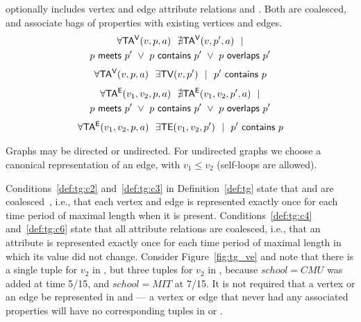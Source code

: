 \begin{definition}
\tve optionally includes vertex and edge attribute relations \tav
and \tae.  Both are coalesced, and associate bags of properties with
existing vertices and edges.
\begin{multline}
\forall \mathsf{TA^{V}}(v, p, a)~~\nexists \mathsf{TA^{V}}(v, p', a)~~| \\
                       p~\mathsf{meets}~p'~\lor~p~\mathsf{contains}~p'~\lor~p~\mathsf{overlaps}~p'
\label{def:tg:c4}
\end{multline}
\vspace{-0.5cm}
\begin{multline}
\forall \mathsf{TA^{V}}(v, p, a)~~\exists \textsf{TV}(v,p')~~|~~p'~\mathsf{contains}~p
\label{def:tg:c5}
\end{multline}
\vspace{-0.5cm}
\begin{multline}
\forall \mathsf{TA^{E}}(v_1, v_2, p, a)~~\nexists \mathsf{TA^{E}}(v_1, v_2, p', a)~~| \\
                       p~\mathsf{meets}~p'~\lor~p~\mathsf{contains}~p'~\lor~p~\mathsf{overlaps}~p'
\label{def:tg:c6}
\end{multline}
\vspace{-0.5cm}
\begin{multline}
\forall \mathsf{TA^{E}}(v_1, v_2, p, a)~~\exists \textsf{TE}(v_1,v_2,p')~~|~~p'~\mathsf{contains}~p
\label{def:tg:c7}
\end{multline}
\vspace{-0.6cm}
\label{def:tg}
\end{definition}

Graphs may be directed or undirected.  For undirected graphs we choose
a canonical representation of an edge, with $v_1 \leq v_2$ (self-loops
are allowed).

Conditions~\ref{def:tg:c2} and~\ref{def:tg:c3} in
Definition~\ref{def:tg} state that \tv and \te are
coalesced~\cite{DBLP:conf/vldb/BohlenSS96}, i.e., that each vertex and
edge is represented exactly once for each time period of maximal
length when it is present.  Conditions~\ref{def:tg:c4}
and~\ref{def:tg:c6} state that all attribute relations are coalesced,
i.e., that an attribute is represented exactly once for each time
period of maximal length in which its value did not change.  Consider
Figure~\ref{fig:tg_ve} and note that there is a single tuple for $v_2$
in \tv, but three tuples for $v_2$ in \tav, because $school=CMU$ was
added at time 5/15, and $school=MIT$ at 7/15.  It is not required that
a vertex or an edge be represented in \tav and \tae --- a vertex or
edge that never had any associated properties will have no
corresponding tuples in \tav or \tae.

